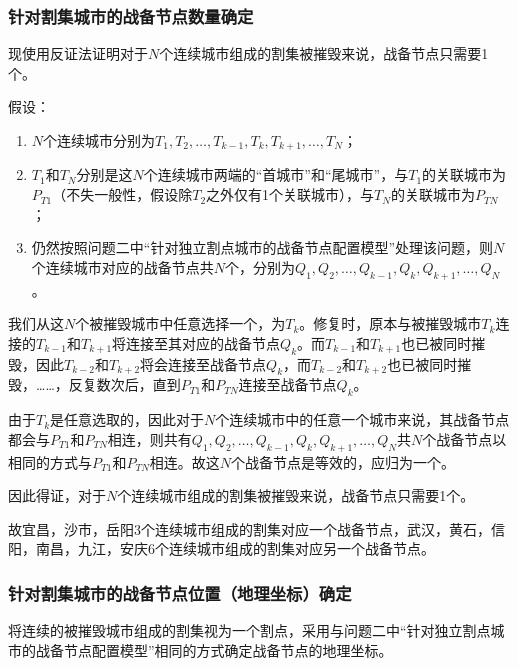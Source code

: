 \documentclass{article}
\begin{document}
\subsubsection{针对割集城市的战备节点数量确定}
\label{针对割集城市的战备节点数量确定}

现使用反证法证明对于$N$个连续城市组成的割集被摧毁来说，战备节点只需要1个。

假设：

\begin{enumerate}
	\item $N$个连续城市分别为$T_1,T_2,\dots,T_{k-1},T_{k},T_{k+1},\dots,T_N$；
	\item $T_1$和$T_N$分别是这$N$个连续城市两端的“首城市”和“尾城市”，与$T_1$的关联城市为$P_{T1}$（不失一般性，假设除$T_2$之外仅有1个关联城市），与$T_N$的关联城市为$P_{TN}$；
	\item 仍然按照问题二中“针对独立割点城市的战备节点配置模型”处理该问题，则$N$个连续城市对应的战备节点共$N$个，分别为$Q_1,Q_2,\dots,Q_{k-1},Q_{k},Q_{k+1},\dots,Q_N$。
\end{enumerate}

我们从这$N$个被摧毁城市中任意选择一个，为$T_{k}$。修复时，原本与被摧毁城市$T_{k}$连接的$T_{k-1}$和$T_{k+1}$将连接至其对应的战备节点$Q_{k}$。而$T_{k-1}$和$T_{k+1}$也已被同时摧毁，因此$T_{k-2}$和$T_{k+2}$将会连接至战备节点$Q_{k}$，而$T_{k-2}$和$T_{k+2}$也已被同时摧毁，……，反复数次后，直到$P_{T1}$和$P_{TN}$连接至战备节点$Q_{k}$。

由于$T_{k}$是任意选取的，因此对于$N$个连续城市中的任意一个城市来说，其战备节点都会与$P_{T1}$和$P_{TN}$相连，则共有$Q_1,Q_2,\dots,Q_{k-1},Q_{k},Q_{k+1},\dots,Q_N$共$N$个战备节点以相同的方式与$P_{T1}$和$P_{TN}$相连。故这$N$个战备节点是等效的，应归为一个。

因此得证，对于$N$个连续城市组成的割集被摧毁来说，战备节点只需要1个。

故宜昌，沙市，岳阳3个连续城市组成的割集对应一个战备节点，武汉，黄石，信阳，南昌，九江，安庆6个连续城市组成的割集对应另一个战备节点。

\subsubsection{针对割集城市的战备节点位置（地理坐标）确定}
\label{针对割集城市的战备节点位置（地理坐标）确定}

将连续的被摧毁城市组成的割集视为一个割点，采用与问题二中“针对独立割点城市的战备节点配置模型”相同的方式确定战备节点的地理坐标。

\addtocounter{subsection}{-1}
\end{document}

